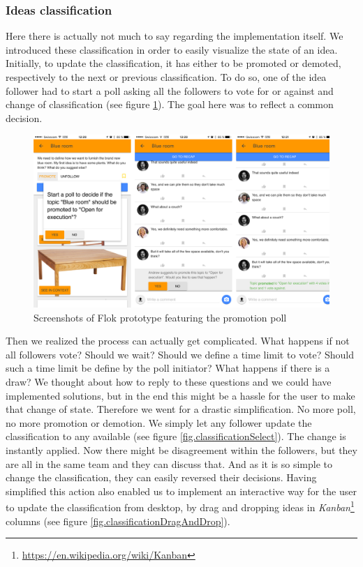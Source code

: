 \documentclass[a4paper,12pt, oneside]{article}
\begin{document}
\subsubsection{Ideas classification}
Here there is actually not much to say regarding the implementation itself.
We introduced these classification in order to easily visualize the state of an idea.
Initially, to update the classification, it has either to be promoted or demoted, respectively to the next or previous classification.
To do so, one of the idea follower had to start a poll asking all the followers to vote for or against and change of classification (see figure \ref{fig.promotionPoll}).
The goal here was to reflect a common decision.

\begin{figure}[!htb]
\centering
\includegraphics[width=\textwidth]{images/promotionPoll.png}
\caption{Screenshots of Flok prototype featuring the promotion poll}
\label{fig.promotionPoll}
\end{figure}

Then we realized the process can actually get complicated.
What happens if not all followers vote?
Should we wait?
Should we define a time limit to vote? Should such a time limit be define by the poll initiator?
What happens if there is a draw?
We thought about how to reply to these questions and we could have implemented solutions, but in the end this might be a hassle for the user to make that change of state.
Therefore we went for a drastic simplification.
No more poll, no more promotion or demotion.
We simply let any follower update the classification to any available (see figure \ref{fig.classificationSelect}).
The change is instantly applied.
Now there might be disagreement within the followers, but they are all in the same team and they can discuss that.
And as it is so simple to change the classification, they can easily reversed their decisions.
Having simplified this action also enabled us to implement an interactive way for the user to update the classification from desktop, by drag and dropping ideas in \emph{Kanban}\footnote{\url{https://en.wikipedia.org/wiki/Kanban}} columns (see figure \ref{fig.classificationDragAndDrop}).
\end{document}
